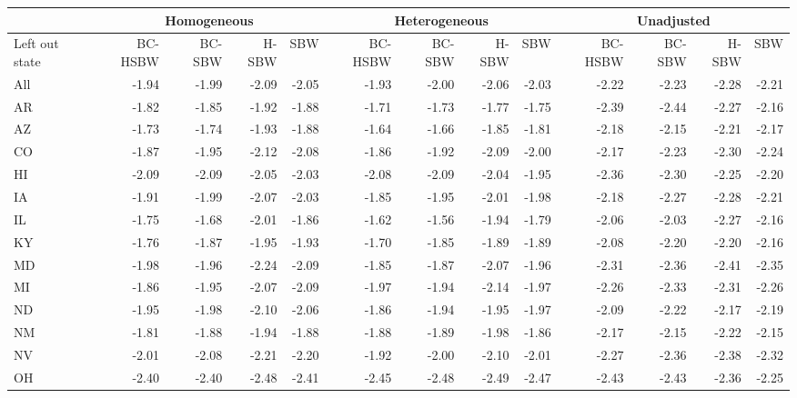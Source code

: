 \begin{landscape}
\captionsetup[table]{labelformat=empty,skip=1pt}
\begin{table}\caption{Leave one state out jackknife point estimates: all estimators, early expansion excluded}\label{tab:loojackknifec2}
\begin{longtable}{lrrrr|rrrr|rrrr}
\hline
 & \multicolumn{4}{c}{Homogeneous} & \multicolumn{4}{c}{Heterogeneous} & \multicolumn{4}{c}{Unadjusted} \\ 
 \hline
Left out state & BC-HSBW & BC-SBW & H-SBW & SBW & BC-HSBW & BC-SBW & H-SBW & SBW & BC-HSBW & BC-SBW & H-SBW & SBW \\ 
\hline
All & -1.94 & -1.99 & -2.09 & -2.05 & -1.93 & -2.00 & -2.06 & -2.03 & -2.22 & -2.23 & -2.28 & -2.21 \\ 
AR & -1.82 & -1.85 & -1.92 & -1.88 & -1.71 & -1.73 & -1.77 & -1.75 & -2.39 & -2.44 & -2.27 & -2.16 \\ 
AZ & -1.73 & -1.74 & -1.93 & -1.88 & -1.64 & -1.66 & -1.85 & -1.81 & -2.18 & -2.15 & -2.21 & -2.17 \\ 
CO & -1.87 & -1.95 & -2.12 & -2.08 & -1.86 & -1.92 & -2.09 & -2.00 & -2.17 & -2.23 & -2.30 & -2.24 \\ 
HI & -2.09 & -2.09 & -2.05 & -2.03 & -2.08 & -2.09 & -2.04 & -1.95 & -2.36 & -2.30 & -2.25 & -2.20 \\ 
IA & -1.91 & -1.99 & -2.07 & -2.03 & -1.85 & -1.95 & -2.01 & -1.98 & -2.18 & -2.27 & -2.28 & -2.21 \\ 
IL & -1.75 & -1.68 & -2.01 & -1.86 & -1.62 & -1.56 & -1.94 & -1.79 & -2.06 & -2.03 & -2.27 & -2.16 \\ 
KY & -1.76 & -1.87 & -1.95 & -1.93 & -1.70 & -1.85 & -1.89 & -1.89 & -2.08 & -2.20 & -2.20 & -2.16 \\ 
MD & -1.98 & -1.96 & -2.24 & -2.09 & -1.85 & -1.87 & -2.07 & -1.96 & -2.31 & -2.36 & -2.41 & -2.35 \\ 
MI & -1.86 & -1.95 & -2.07 & -2.09 & -1.97 & -1.94 & -2.14 & -1.97 & -2.26 & -2.33 & -2.31 & -2.26 \\ 
ND & -1.95 & -1.98 & -2.10 & -2.06 & -1.86 & -1.94 & -1.95 & -1.97 & -2.09 & -2.22 & -2.17 & -2.19 \\ 
NM & -1.81 & -1.88 & -1.94 & -1.88 & -1.88 & -1.89 & -1.98 & -1.86 & -2.17 & -2.15 & -2.22 & -2.15 \\ 
NV & -2.01 & -2.08 & -2.21 & -2.20 & -1.92 & -2.00 & -2.10 & -2.01 & -2.27 & -2.36 & -2.38 & -2.32 \\ 
OH & -2.40 & -2.40 & -2.48 & -2.41 & -2.45 & -2.48 & -2.49 & -2.47 & -2.43 & -2.43 & -2.36 & -2.25 \\ 

\end{longtable}
\end{table}
\end{landscape}
